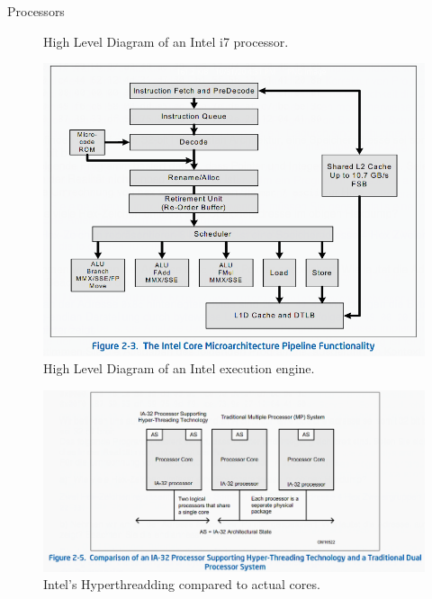 \documentclass[10pt]{beamer}
\begin{document}
\begin{frame}[allowframebreaks]{Processors}
\begin{figure}
\begin{center}
      \end{center}
      \caption{High Level Diagram of an Intel i7 processor.~\autocite{intel}}
      \end{figure}
      \framebreak
      \begin{figure}
       \begin{center}
       \includegraphics[keepaspectratio, width=\textwidth,height=0.9\textheight-4\baselineskip]{img/204_execution_engine_i7.png}
      \end{center}
      \caption{High Level Diagram of an Intel execution engine.~\autocite{intel}}
      \end{figure}
      \framebreak
      \begin{figure}
       \begin{center}
       \includegraphics[keepaspectratio, width=\textwidth,height=0.9\textheight-4\baselineskip]{img/205_hyperthreadding.png}
      \end{center}
      \caption{Intel's Hyperthreadding compared to actual cores.~\autocite{intel}}

\end{figure}
\end{frame}
\end{document}
